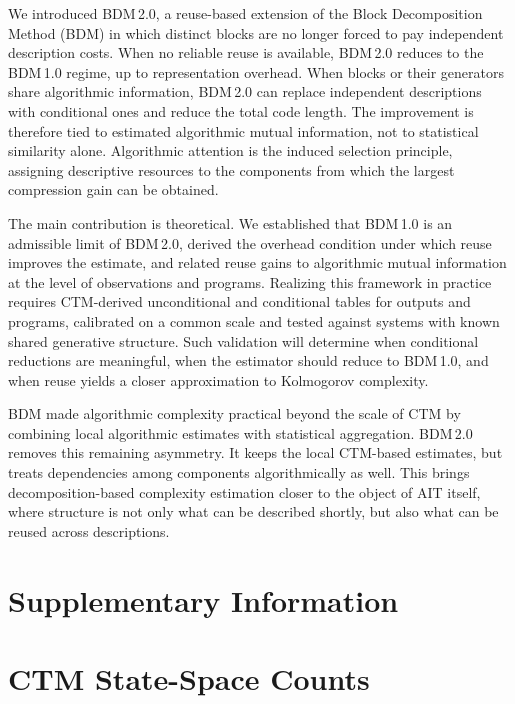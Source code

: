 \documentclass{article}
\begin{document}
We introduced BDM\,2.0, a reuse-based extension of the Block Decomposition Method (BDM) in which distinct blocks are no longer forced to pay independent description costs. When no reliable reuse is available, BDM\,2.0 reduces to the BDM\,1.0 regime, up to representation overhead. When blocks or their generators share algorithmic information, BDM\,2.0 can replace independent descriptions with conditional ones and reduce the total code length. The improvement is therefore tied to estimated algorithmic mutual information, not to statistical similarity alone. Algorithmic attention is the induced selection principle, assigning descriptive resources to the components from which the largest compression gain can be obtained.

The main contribution is theoretical. We established that BDM\,1.0 is an admissible limit of BDM\,2.0, derived the overhead condition under which reuse improves the estimate, and related reuse gains to algorithmic mutual information at the level of observations and programs. Realizing this framework in practice requires CTM-derived unconditional and conditional tables for outputs and programs, calibrated on a common scale and tested against systems with known shared generative structure. Such validation will determine when conditional reductions are meaningful, when the estimator should reduce to BDM\,1.0, and when reuse yields a closer approximation to Kolmogorov complexity.

BDM made algorithmic complexity practical beyond the scale of CTM by combining local algorithmic estimates with statistical aggregation. BDM\,2.0 removes this remaining asymmetry. It keeps the local CTM-based estimates, but treats dependencies among components algorithmically as well. This brings decomposition-based complexity estimation closer to the object of AIT itself, where structure is not only what can be described shortly, but also what can be reused across descriptions.




\newpage

\appendix

\section*{Supplementary Information}

\section{CTM State-Space Counts}
\label{app:ctm_counts}
\end{document}
